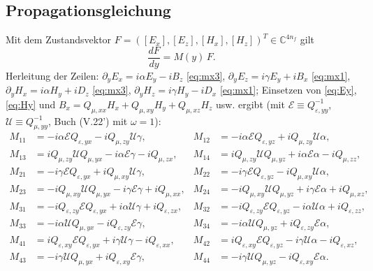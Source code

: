 \subsection{Propagationsgleichung}
Mit dem Zustandsvektor $F=([E_x],[E_z],[H_x],[H_z])^T\in\mathbb C^{4n_f}$ gilt
\begin{equation}
  \frac{dF}{dy}=M(y)\,F .
  \label{eq:ode}
\end{equation}
Herleitung der Zeilen: $\partial_yE_x=i\alpha E_y-iB_z$ \eqref{eq:mx3}, $\partial_yE_z=i\gamma E_y+iB_x$
\eqref{eq:mx1}, $\partial_yH_x=i\alpha H_y+iD_z$ \eqref{eq:mx3}, $\partial_yH_z=i\gamma H_y-iD_x$
\eqref{eq:mx1}; Einsetzen von \eqref{eq:Ey}, \eqref{eq:Hy} und
$B_x=Q_{\mu,xx}H_x+Q_{\mu,xy}H_y+Q_{\mu,xz}H_z$ usw. ergibt
(mit $\mathcal E\equiv Q_{\varepsilon,yy}^{-1}$, $\mathcal U\equiv Q_{\mu,yy}^{-1}$, Buch (V.22') mit $\omega=1$):
\begin{equation}
\begin{aligned}
  M_{11}&=-i\alpha\mathcal EQ_{\varepsilon,yx}-iQ_{\mu,zy}\mathcal U\gamma, &
  M_{12}&=-i\alpha\mathcal EQ_{\varepsilon,yz}+iQ_{\mu,zy}\mathcal U\alpha,\\
  M_{13}&=iQ_{\mu,zy}\mathcal UQ_{\mu,yx}-i\alpha\mathcal E\gamma-iQ_{\mu,zx}, &
  M_{14}&=iQ_{\mu,zy}\mathcal UQ_{\mu,yz}+i\alpha\mathcal E\alpha-iQ_{\mu,zz},\\
  M_{21}&=-i\gamma\mathcal EQ_{\varepsilon,yx}+iQ_{\mu,xy}\mathcal U\gamma, &
  M_{22}&=-i\gamma\mathcal EQ_{\varepsilon,yz}-iQ_{\mu,xy}\mathcal U\alpha,\\
  M_{23}&=-iQ_{\mu,xy}\mathcal UQ_{\mu,yx}-i\gamma\mathcal E\gamma+iQ_{\mu,xx}, &
  M_{24}&=-iQ_{\mu,xy}\mathcal UQ_{\mu,yz}+i\gamma\mathcal E\alpha+iQ_{\mu,xz},\\
  M_{31}&=-iQ_{\varepsilon,zy}\mathcal EQ_{\varepsilon,yx}+i\alpha\mathcal U\gamma+iQ_{\varepsilon,zx}, &
  M_{32}&=-iQ_{\varepsilon,zy}\mathcal EQ_{\varepsilon,yz}-i\alpha\mathcal U\alpha+iQ_{\varepsilon,zz},\\
  M_{33}&=-i\alpha\mathcal UQ_{\mu,yx}-iQ_{\varepsilon,zy}\mathcal E\gamma, &
  M_{34}&=-i\alpha\mathcal UQ_{\mu,yz}+iQ_{\varepsilon,zy}\mathcal E\alpha,\\
  M_{41}&=iQ_{\varepsilon,xy}\mathcal EQ_{\varepsilon,yx}+i\gamma\mathcal U\gamma-iQ_{\varepsilon,xx}, &
  M_{42}&=iQ_{\varepsilon,xy}\mathcal EQ_{\varepsilon,yz}-i\gamma\mathcal U\alpha-iQ_{\varepsilon,xz},\\
  M_{43}&=-i\gamma\mathcal UQ_{\mu,yx}+iQ_{\varepsilon,xy}\mathcal E\gamma, &
  M_{44}&=-i\gamma\mathcal UQ_{\mu,yz}-iQ_{\varepsilon,xy}\mathcal E\alpha .
\end{aligned}
\label{eq:Mgeneral}
\end{equation}
